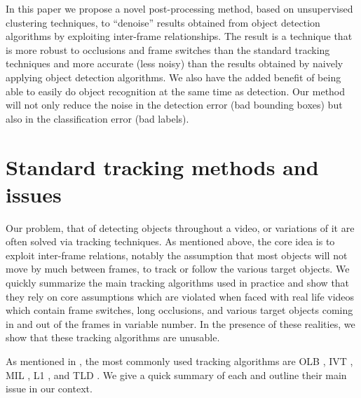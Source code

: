 \documentclass{article}
\begin{document}
In this paper we propose a novel post-processing method, based on unsupervised clustering techniques, to ``denoise'' results obtained
from object detection algorithms by exploiting inter-frame relationships. The result is a technique that is more robust to occlusions and frame switches than the standard
tracking techniques and more accurate (less noisy) than the results obtained by naively applying object detection algorithms. We also have the added benefit of being able to easily
do object recognition at the same time as detection. Our method will not only reduce the noise in the detection error (bad bounding boxes) but also in the classification error (bad labels).

\section{Standard tracking methods and issues}

Our problem, that of detecting objects throughout a video, or variations of it are often solved via tracking techniques. As mentioned above, the core idea is to exploit
inter-frame relations, notably the assumption that most objects will not move by much between frames, to track or follow the various target objects. We quickly summarize
the main tracking algorithms used in practice and show that they rely on core assumptions which are violated
when faced with real life videos which contain frame switches, long occlusions, and various target objects coming in and out
of the frames in variable number. In the presence of these realities, we show that these tracking algorithms are unusable.

As mentioned in \cite{benchmarksurvey}, the most commonly used tracking algorithms are OLB \cite{OLB}, IVT \cite{IVT}, MIL \cite{miltrack}, L1 \cite{L1}, and TLD \cite{TLD}.
We give a quick summary of each and outline their main issue in our context.
\end{document}
